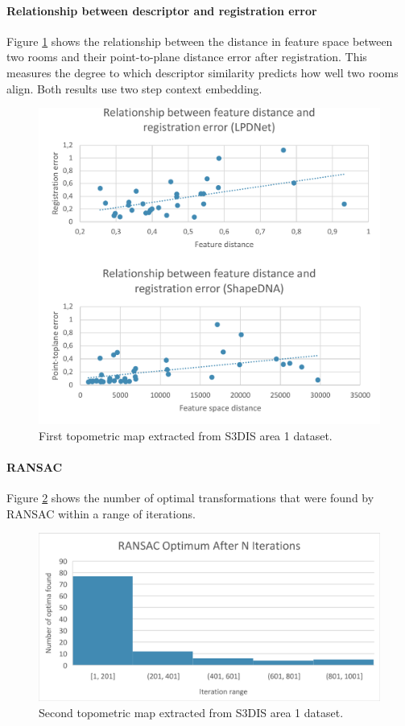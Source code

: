\paragraph{Relationship between descriptor and registration error}
Figure \ref{fig:lpdnet_registration} shows the relationship between the distance in feature space between two rooms and their point-to-plane distance error after registration. This measures the degree to which descriptor similarity predicts how well two rooms align. Both results use two step context embedding.


\begin{figure}[h]
    \centering
    \includegraphics*[width=\textwidth]{./fig/registration_charts.pdf}
    \caption{First topometric map extracted from S3DIS area 1 dataset.}
    \label{fig:lpdnet_registration}
\end{figure}

\paragraph{RANSAC}
Figure \ref{fig:ransac_results} shows the number of optimal transformations that were found by RANSAC within a range of iterations. 

\begin{figure}[h]
    \centering
    \includegraphics*[width=\textwidth]{./fig/ransac_optima.pdf}
    \caption{Second topometric map extracted from S3DIS area 1 dataset.}
    \label{fig:ransac_results}
\end{figure}


